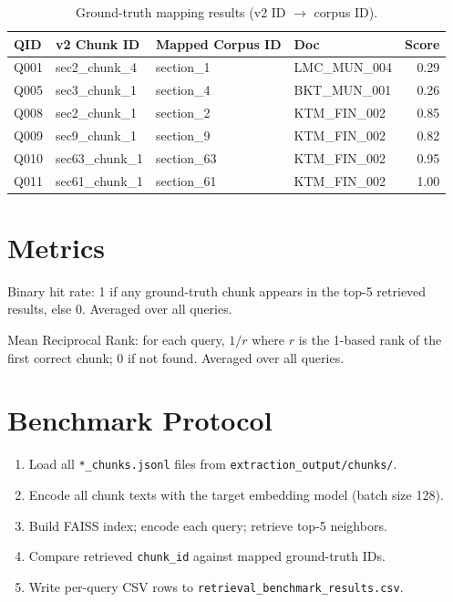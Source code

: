 \begin{table}[H]
  \centering
  \caption{Ground-truth mapping results (v2 ID $\rightarrow$ corpus ID).}
  \label{tab:gt-mapping}
  \small
  \begin{tabular}{@{}llllr@{}}
    \toprule
    \textbf{QID} & \textbf{v2 Chunk ID} & \textbf{Mapped Corpus ID} & \textbf{Doc} & \textbf{Score} \\
    \midrule
    Q001 & sec2\_chunk\_4 & section\_1 & LMC\_MUN\_004 & 0.29 \\
    Q005 & sec3\_chunk\_1 & section\_4 & BKT\_MUN\_001 & 0.26 \\
    Q008 & sec2\_chunk\_1 & section\_2 & KTM\_FIN\_002 & 0.85 \\
    Q009 & sec9\_chunk\_1 & section\_9 & KTM\_FIN\_002 & 0.82 \\
    Q010 & sec63\_chunk\_1 & section\_63 & KTM\_FIN\_002 & 0.95 \\
    Q011 & sec61\_chunk\_1 & section\_61 & KTM\_FIN\_002 & 1.00 \\
    \bottomrule
  \end{tabular}
\end{table}

\section{Metrics}
\begin{description}[leftmargin=3cm,style=nextline]
  \item[Recall@5] Binary hit rate: 1 if any ground-truth chunk appears in the top-5 retrieved results, else 0. Averaged over all queries.
  \item[MRR] Mean Reciprocal Rank: for each query, $1/r$ where $r$ is the 1-based rank of the first correct chunk; 0 if not found. Averaged over all queries.
\end{description}

\section{Benchmark Protocol}
\begin{enumerate}[leftmargin=*]
  \item Load all \texttt{*\_chunks.jsonl} files from \texttt{extraction\_output/chunks/}.
  \item Encode all chunk texts with the target embedding model (batch size 128).
  \item Build FAISS index; encode each query; retrieve top-5 neighbors.
  \item Compare retrieved \texttt{chunk\_id} against mapped ground-truth IDs.
  \item Write per-query CSV rows to \texttt{retrieval\_benchmark\_results.csv}.
\end{enumerate}

